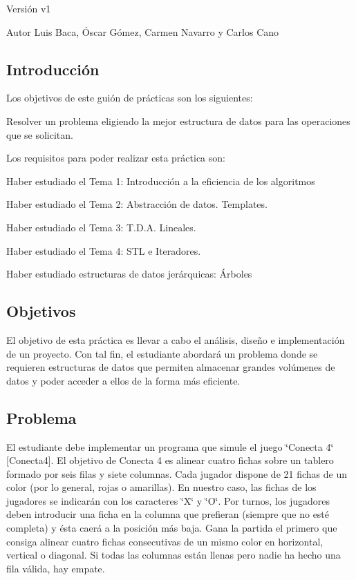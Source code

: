 \begin{DoxyVersion}{Versión}
v1 
\end{DoxyVersion}
\begin{DoxyAuthor}{Autor}
Luis Baca, Óscar Gómez, Carmen Navarro y Carlos Cano
\end{DoxyAuthor}
\hypertarget{index_introduccion}{}\subsection{Introducción}\label{index_introduccion}
Los objetivos de este guión de prácticas son los siguientes\+:
\begin{DoxyItemize}
\item Resolver un problema eligiendo la mejor estructura de datos para las operaciones que se solicitan.
\end{DoxyItemize}

Los requisitos para poder realizar esta práctica son\+:
\begin{DoxyEnumerate}
\item Haber estudiado el Tema 1\+: Introducción a la eficiencia de los algoritmos
\item Haber estudiado el Tema 2\+: Abstracción de datos. Templates.
\item Haber estudiado el Tema 3\+: T.\+D.\+A. Lineales.
\item Haber estudiado el Tema 4\+: S\+TL e Iteradores.
\item Haber estudiado estructuras de datos jerárquicas\+: Árboles
\end{DoxyEnumerate}\hypertarget{index_objetivos}{}\subsection{Objetivos}\label{index_objetivos}
El objetivo de esta práctica es llevar a cabo el análisis, diseño e implementación de un proyecto. Con tal fin, el estudiante abordará un problema donde se requieren estructuras de datos que permiten almacenar grandes volúmenes de datos y poder acceder a ellos de la forma más eficiente.\hypertarget{index_problema}{}\subsection{Problema}\label{index_problema}
El estudiante debe implementar un programa que simule el juego \char`\"{}\+Conecta 4\char`\"{} \mbox{[}Conecta4\mbox{]}. El objetivo de Conecta 4 es alinear cuatro fichas sobre un tablero formado por seis filas y siete columnas. Cada jugador dispone de 21 fichas de un color (por lo general, rojas o amarillas). En nuestro caso, las fichas de los jugadores se indicarán con los caracteres \char`\"{}\+X\char`\"{} y \char`\"{}\+O\char`\"{}. Por turnos, los jugadores deben introducir una ficha en la columna que prefieran (siempre que no esté completa) y ésta caerá a la posición más baja. Gana la partida el primero que consiga alinear cuatro fichas consecutivas de un mismo color en horizontal, vertical o diagonal. Si todas las columnas están llenas pero nadie ha hecho una fila válida, hay empate.

